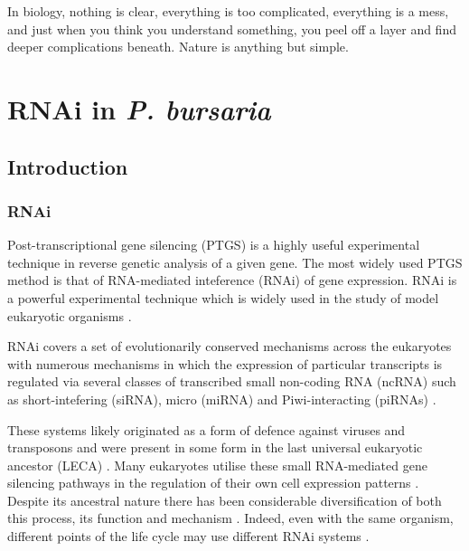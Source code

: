 \graphicspath{{chapters/6.Chapter_4/figures/}}

\begin{savequote}[75mm]
In biology, nothing is clear, everything is too complicated, everything is a mess, 
and just when you think you understand something, you peel off a layer and find 
deeper complications beneath. Nature is anything but simple.
\end{savequote}

\chapter{RNAi in \textit{P. bursaria}}

\section{Introduction}

\subsection{RNAi}

Post-transcriptional gene silencing (PTGS) is a highly useful experimental technique
in reverse genetic analysis of a given gene.  
The most widely used PTGS method is that of RNA-mediated inteference (RNAi)
of gene expression. 
RNAi \citep{Fire1998} is a powerful experimental technique which is widely used 
in the study of model eukaryotic organisms \citep{Morf2013,Batista2011,Matthew2004,Ketting2011,Chang2012}.

RNAi covers a set of evolutionarily conserved mechanisms across the eukaryotes 
with numerous mechanisms in which the expression of particular transcripts
is regulated via several classes of transcribed small non-coding RNA (ncRNA)
such as short-intefering (siRNA), micro (miRNA) and Piwi-interacting (piRNAs) \citep{Carthew2009}.

These systems likely originated as a form of defence against
viruses and transposons \citep{Waterhouse2001,Buchon2006}
and were present in some form in the last universal eukaryotic
ancestor (LECA) \citep{Cerutti2006,Shabalina2008}.  Many eukaryotes
utilise these small RNA-mediated gene silencing pathways
in the regulation of their own cell expression patterns \citep{Wu2008}.
Despite its ancestral nature there has been considerable diversification
of both this process, its function and mechanism \citep{Ketting2011}.
Indeed, even with the same organism, different points of the life cycle
may use different RNAi systems \citep{Flemr2013}.


